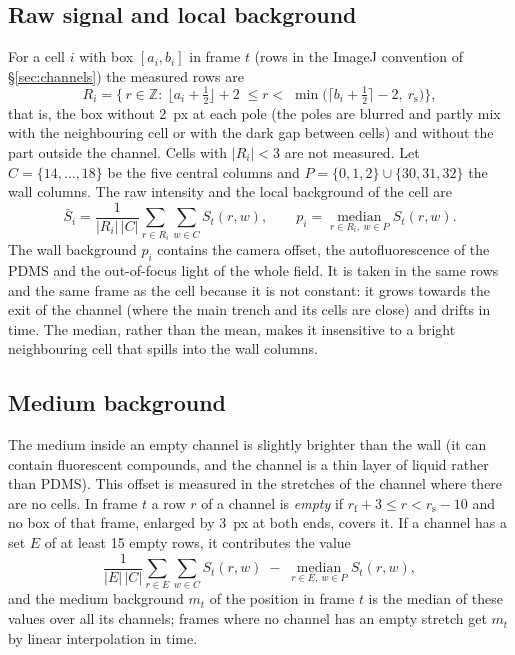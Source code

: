 \documentclass[11pt,a4paper]{article}
\newcommand{\rf}{r_{\mathrm{f}}}     %
\newcommand{\rs}{r_{\mathrm{s}}}     %
\begin{document}
\subsection{Raw signal and local background}
For a cell $i$ with box $[a_i,b_i]$ in frame $t$ (rows in the ImageJ convention of \S\ref{sec:channels}) the measured rows are
\begin{equation}
R_i=\bigl\{\,r\in\mathbb Z:\ \lfloor a_i+\tfrac12\rfloor+2\;\le r<\;\min\bigl(\lceil b_i+\tfrac12\rceil-2,\ \rs\bigr)\bigr\},
\end{equation}
that is, the box without \SI{2}{px} at each pole (the poles are blurred and partly mix with the neighbouring cell or with the dark gap between cells) and without the part outside the channel. Cells with $|R_i|<3$ are not measured. Let $C=\{14,\dots,18\}$ be the five central columns and $P=\{0,1,2\}\cup\{30,31,32\}$ the wall columns. The raw intensity and the local background of the cell are
\begin{equation}
\bar S_i=\frac{1}{|R_i|\,|C|}\sum_{r\in R_i}\sum_{w\in C}S_t(r,w),\qquad
p_i=\operatorname*{median}_{r\in R_i,\ w\in P}S_t(r,w).
\end{equation}
The wall background $p_i$ contains the camera offset, the autofluorescence of the PDMS and the out-of-focus light of the whole field. It is taken in the same rows and the same frame as the cell because it is not constant: it grows towards the exit of the channel (where the main trench and its cells are close) and drifts in time. The median, rather than the mean, makes it insensitive to a bright neighbouring cell that spills into the wall columns.

\subsection{Medium background}
The medium inside an empty channel is slightly brighter than the wall (it can contain fluorescent compounds, and the channel is a thin layer of liquid rather than PDMS). This offset is measured in the stretches of the channel where there are no cells. In frame $t$ a row $r$ of a channel is \emph{empty} if $\rf+3\le r<\rs-10$ and no box of that frame, enlarged by \SI{3}{px} at both ends, covers it. If a channel has a set $E$ of at least 15 empty rows, it contributes the value
\begin{equation}
\frac{1}{|E|\,|C|}\sum_{r\in E}\sum_{w\in C}S_t(r,w)\;-\;\operatorname*{median}_{r\in E,\ w\in P}S_t(r,w),
\end{equation}
and the medium background $m_t$ of the position in frame $t$ is the median of these values over all its channels; frames where no channel has an empty stretch get $m_t$ by linear interpolation in time.
\end{document}
